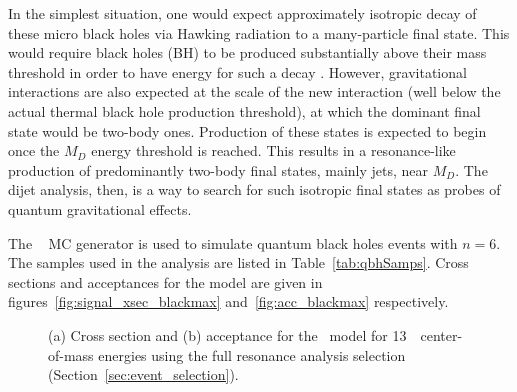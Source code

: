 In the simplest situation, one would expect approximately isotropic decay of these micro black holes via Hawking
radiation to a many-particle final state. This would require black holes (BH) to be produced substantially
above their mass threshold in order to have energy for such a decay \cite{Feng:2004}. 
However, gravitational interactions are also expected at the scale of the new interaction 
(well below the actual thermal black hole production threshold), at which the dominant final state would be two-body ones.
Production of these
states is expected to begin once the $M_D$ energy threshold is reached. 
This results in a resonance-like production of predominantly
two-body final states, mainly jets, near $M_D$. The dijet analysis, then, is a way to search for such
isotropic final states as probes of quantum gravitational effects.

The \BlackMax~\cite{Dai:2007ki} MC generator is used to simulate quantum black holes events with $n=6$. The samples used in the analysis
are listed in Table~\ref{tab:qbhSamps}. Cross sections and acceptances for the model are given in figures~\ref{fig:signal_xsec_blackmax} and~\ref{fig:acc_blackmax} respectively.

\begin{figure}[!htb]
  \centering
  \caption{(a) Cross section and (b) acceptance for the 
  \BlackMax\ model for 13~\TeV~center-of-mass energies using the full resonance
  analysis selection (Section~\ref{sec:event_selection}).}

\end{figure}


